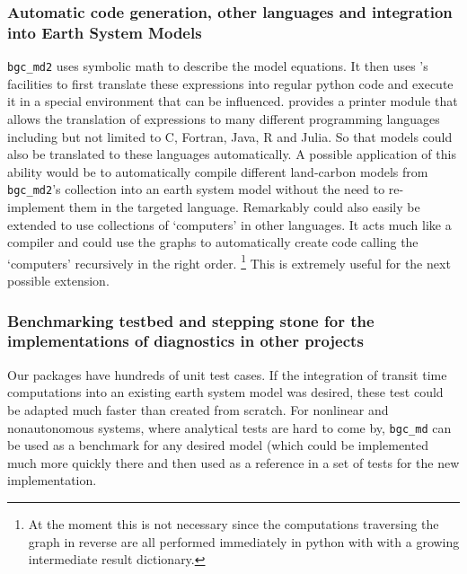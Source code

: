 \subsubsection{Automatic code generation, other languages and integration into Earth System Models}
\texttt{bgc\_md2} uses symbolic math to describe the model equations. It then
uses \sympy{}'s facilities to first translate these expressions into regular python code and execute it in a special environment that can be influenced.
\sympy{}
provides a printer module that allows the translation of \sympy{} 
expressions to many different programming languages including but not limited to C, Fortran, Java, R and Julia.
So that models could also be translated to these languages automatically. 
A possible application of this ability would be to automatically compile different land-carbon models from \texttt{bgc\_md2}'s collection into an earth system model without the need to re-implement them in the targeted language. 
Remarkably \ComputabilityGraphs could also easily be extended to use collections of `computers' in other languages. 
It acts much like a compiler and could use the graphs to automatically create code calling the `computers' recursively in the right order. 
\footnote{At the moment this is not necessary since the computations traversing the graph in reverse are all performed immediately in python with with a growing intermediate result dictionary.}  
This is extremely useful for the next possible extension.

\subsubsection{Benchmarking testbed and stepping stone for the implementations of diagnostics in other projects}
Our packages have hundreds of unit test cases. If the integration of transit time computations into an existing earth system model was desired, these test could be adapted
much faster than created from scratch. For nonlinear and nonautonomous systems, where analytical tests are hard to come by, \texttt{bgc\_md} can be used as a benchmark for any desired model (which could be implemented much more quickly there and then used as a reference in a set of tests for the new implementation.

